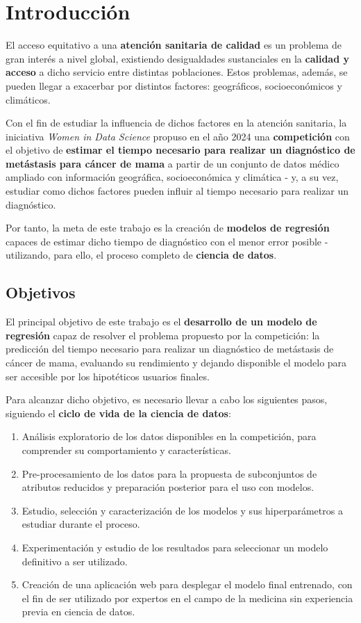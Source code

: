 \chapter{Introducción}

El acceso equitativo a una \textbf{atención sanitaria de calidad} es un problema de gran interés a nivel global, existiendo desigualdades sustanciales en la \textbf{calidad y acceso} a dicho servicio entre distintas poblaciones. Estos problemas, además, se pueden llegar a exacerbar por distintos factores: geográficos, socioeconómicos y climáticos.

Con el fin de estudiar la influencia de dichos factores en la atención sanitaria, la iniciativa \textit{Women in Data Science} propuso en el año 2024 una \textbf{competición} \cite{widsdatathon2024-challenge2} con el objetivo de \textbf{estimar el tiempo necesario para realizar un diagnóstico de metástasis para cáncer de mama} a partir de un conjunto de datos médico ampliado con información geográfica, socioeconómica y climática - y, a su vez, estudiar como dichos factores pueden influir al tiempo necesario para realizar un diagnóstico.

Por tanto, la meta de este trabajo es la creación de \textbf{modelos de regresión} capaces de estimar dicho tiempo de diagnóstico con el menor error posible - utilizando, para ello, el proceso completo de \textbf{ciencia de datos}.

\section{Objetivos}

El principal objetivo de este trabajo es el \textbf{desarrollo de un modelo de regresión} capaz de resolver el problema propuesto por la competición: la predicción del tiempo necesario para realizar un diagnóstico de metástasis de cáncer de mama, evaluando su rendimiento y dejando disponible el modelo para ser accesible por los hipotéticos usuarios finales.

Para alcanzar dicho objetivo, es necesario llevar a cabo los siguientes pasos, siguiendo el \textbf{ciclo de vida de la ciencia de datos}:
\begin{enumerate}
	\item Análisis exploratorio de los datos disponibles en la competición, para comprender su comportamiento y características.
	\item Pre-procesamiento de los datos para la propuesta de subconjuntos de atributos reducidos y preparación posterior para el uso con modelos.
	\item Estudio, selección y caracterización de los modelos y sus hiperparámetros a estudiar durante el proceso.
	\item Experimentación y estudio de los resultados para seleccionar un modelo definitivo a ser utilizado.
	\item Creación de una aplicación web para desplegar el modelo final entrenado, con el fin de ser utilizado por expertos en el campo de la medicina sin experiencia previa en ciencia de datos.
\end{enumerate}

